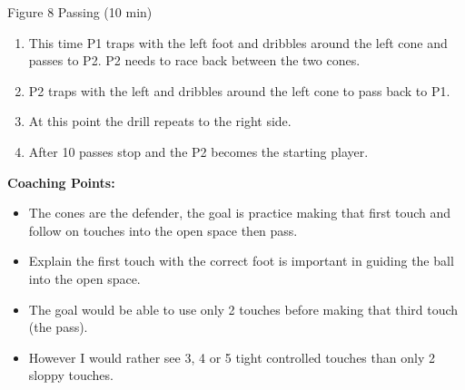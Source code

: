 \begin{evenBlock}{Figure 8 Passing (10 min)}
\begin{minipage}[t]{\linewidth}
\begin{minipage}{.6\linewidth}
\begin{enumerate}
            \item This time P1 traps with the left foot and dribbles around the left cone and passes to P2.  P2 needs to race back between the two cones.
            \item P2 traps with the left and dribbles around the left cone to pass back to P1.
            \item At this point the drill repeats to the right side.
            \item After 10 passes stop and the P2 becomes the starting player.
        \end{enumerate}
    \end{minipage}
\end{minipage}

\textbf{Coaching Points:}
\begin{itemize}
    \setlength{\itemsep}{0pt}
    \setlength{\parskip}{0pt}
    \setlength{\parsep}{0pt}
    \item The cones are the defender, the goal is practice making that first touch and follow on touches into the open space then pass.
    \item Explain the first touch with the correct foot is important in guiding the ball into the open space.
    \item The goal would be able to use only 2 touches before making that third touch (the pass). 
    \item However I would rather see 3, 4 or 5 tight controlled touches than only 2 sloppy touches.

\end{itemize}


\end{evenBlock}